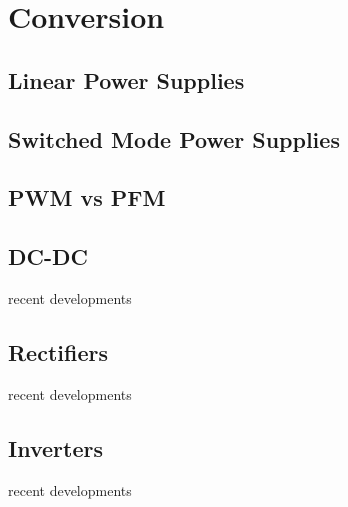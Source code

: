 \chapter{Conversion}
\label{ch:conv}

\section{Linear Power Supplies}

\section{Switched Mode Power Supplies}

\section{PWM vs PFM}

\section{DC-DC}
recent developments

\section{Rectifiers}
recent developments

\section{Inverters}
recent developments
